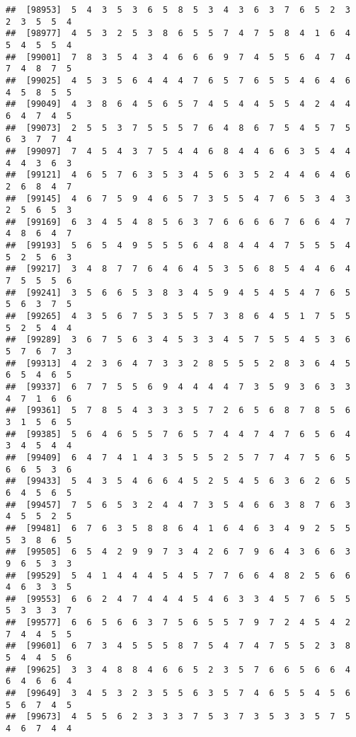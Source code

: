 \documentclass[
]{book}
\begin{document}
\begin{verbatim}
##  [98953]  5  4  3  5  3  6  5  8  5  3  4  3  6  3  7  6  5  2  3  2  3  5  5  4
##  [98977]  4  5  3  2  5  3  8  6  5  5  7  4  7  5  8  4  1  6  4  5  4  5  5  4
##  [99001]  7  8  3  5  4  3  4  6  6  6  9  7  4  5  5  6  4  7  4  7  4  8  7  5
##  [99025]  4  5  3  5  6  4  4  4  7  6  5  7  6  5  5  4  6  4  6  4  5  8  5  5
##  [99049]  4  3  8  6  4  5  6  5  7  4  5  4  4  5  5  4  2  4  4  6  4  7  4  5
##  [99073]  2  5  5  3  7  5  5  5  7  6  4  8  6  7  5  4  5  7  5  6  3  7  7  4
##  [99097]  7  4  5  4  3  7  5  4  4  6  8  4  4  6  6  3  5  4  4  4  4  3  6  3
##  [99121]  4  6  5  7  6  3  5  3  4  5  6  3  5  2  4  4  6  4  6  2  6  8  4  7
##  [99145]  4  6  7  5  9  4  6  5  7  3  5  5  4  7  6  5  3  4  3  2  5  6  5  3
##  [99169]  6  3  4  5  4  8  5  6  3  7  6  6  6  6  7  6  6  4  7  4  8  6  4  7
##  [99193]  5  6  5  4  9  5  5  5  6  4  8  4  4  4  7  5  5  5  4  5  2  5  6  3
##  [99217]  3  4  8  7  7  6  4  6  4  5  3  5  6  8  5  4  4  6  4  7  5  5  5  6
##  [99241]  3  5  6  6  5  3  8  3  4  5  9  4  5  4  5  4  7  6  5  5  6  3  7  5
##  [99265]  4  3  5  6  7  5  3  5  5  7  3  8  6  4  5  1  7  5  5  5  2  5  4  4
##  [99289]  3  6  7  5  6  3  4  5  3  3  4  5  7  5  5  4  5  3  6  5  7  6  7  3
##  [99313]  4  2  3  6  4  7  3  3  2  8  5  5  5  2  8  3  6  4  5  6  5  4  6  5
##  [99337]  6  7  7  5  5  6  9  4  4  4  4  7  3  5  9  3  6  3  3  4  7  1  6  6
##  [99361]  5  7  8  5  4  3  3  3  5  7  2  6  5  6  8  7  8  5  6  3  1  5  6  5
##  [99385]  5  6  4  6  5  5  7  6  5  7  4  4  7  4  7  6  5  6  4  3  4  5  4  4
##  [99409]  6  4  7  4  1  4  3  5  5  5  2  5  7  7  4  7  5  6  5  6  6  5  3  6
##  [99433]  5  4  3  5  4  6  6  4  5  2  5  4  5  6  3  6  2  6  5  6  4  5  6  5
##  [99457]  7  5  6  5  3  2  4  4  7  3  5  4  6  6  3  8  7  6  3  4  5  5  2  5
##  [99481]  6  7  6  3  5  8  8  6  4  1  6  4  6  3  4  9  2  5  5  5  3  8  6  5
##  [99505]  6  5  4  2  9  9  7  3  4  2  6  7  9  6  4  3  6  6  3  9  6  5  3  3
##  [99529]  5  4  1  4  4  4  5  4  5  7  7  6  6  4  8  2  5  6  6  4  6  3  3  5
##  [99553]  6  6  2  4  7  4  4  4  5  4  6  3  3  4  5  7  6  5  5  5  3  3  3  7
##  [99577]  6  6  5  6  6  3  7  5  6  5  5  7  9  7  2  4  5  4  2  7  4  4  5  5
##  [99601]  6  7  3  4  5  5  5  8  7  5  4  7  4  7  5  5  2  3  8  5  4  4  5  6
##  [99625]  3  3  4  8  8  4  6  6  5  2  3  5  7  6  6  5  6  6  4  6  4  6  6  4
##  [99649]  3  4  5  3  2  3  5  5  6  3  5  7  4  6  5  5  4  5  6  5  6  7  4  5
##  [99673]  4  5  5  6  2  3  3  3  7  5  3  7  3  5  3  3  5  7  5  4  6  7  4  4

\end{verbatim}
\end{document}
